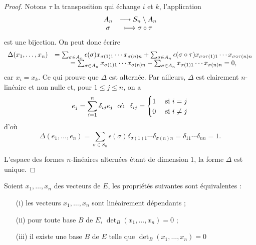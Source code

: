 \documentclass[class=report,crop=false]{standalone}
\begin{document}
\begin{proof}
Notons $\tau$ la transposition qui échange $i$ et $k$, l'application
$$\begin{array}{cc}A_n &\longrightarrow S_n\setminus A_n\cr \sigma &\longmapsto\sigma\circ\tau\end{array}$$
est une bijection. On peut donc écrire
$$\begin{array}{cc}\Delta(x_1,\dots,x_n)&=
\sum_{\sigma\in A_n}\epsilon(\sigma) x_{\sigma(1)1}\cdots x_{\sigma(n)n}+\sum_{\sigma\in A_n} \epsilon(\sigma\circ\tau)x_{\sigma\circ\tau(1)1}\cdots x_{\sigma\circ\tau(n)n}\cr
&=\sum_{\sigma\in A_n} x_{\sigma(1)1}\cdots x_{\sigma(n)n}-\sum_{\sigma\in A_n} x_{\sigma(1)1}\cdots x_{\sigma(n)n}=0,\end{array}$$ car $x_i=x_k$.
Ce qui prouve que $\Delta$ est alternée. Par ailleurs, $\Delta$ est clairement $n$-linéaire et non nulle et, pour $1\leq j\leq n$, on a 
$$e_j=\sum_{i=1}^n \delta_{ij}e_j\ \ {\hbox{où}}\ \ \delta_{ij}=
\begin{cases}1 & \text{ si } i=j\cr 0& \text{ si } i\neq j\end{cases}$$
d'où
$$\Delta(e_1,\dots,e_n)=\sum_{\sigma\in S_n}\epsilon(\sigma)\delta_{\sigma(1)1}\cdots\delta_{\sigma(n)n}
=\delta_{11}\cdots\delta_{nn}=1.$$


L'espace des formes $n$-linéaires alternées étant de dimension $1$, 
la forme $\Delta$ est unique.
\end{proof}




\begin{theoreme}
Soient $x_1,\dots,x_n$ des vecteurs de $E$, 
les propriétés suivantes sont équivalentes :
\begin{itemize}
  \item[(i)] les vecteurs $x_1,\dots,x_n$ sont linéairement dépendants ;
  \item[(ii)] pour toute base $B$ de $E$, ${\det_B}(x_1,\dots,x_n)=0$ ;
  \item[(iii)] il existe une base $B$ de $E$ telle que ${\det_B}(x_1,\dots,x_n)=0$
\end{itemize}
\end{theoreme} 
\end{document}
